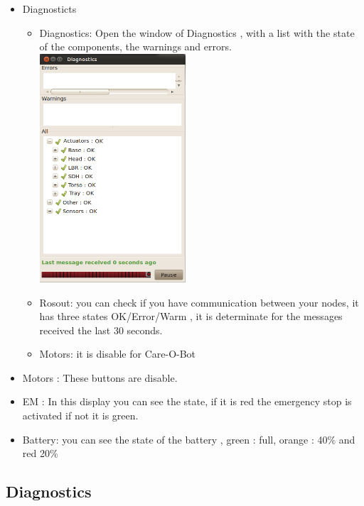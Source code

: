 \begin{itemize}
\item Diagnosticts
\begin{itemize}
\item Diagnostics: Open the window of Diagnostics , with a list with the state of the components, the warnings and errors.
\\
 \includegraphics[width=0.45\textwidth]{images/diagnostics.png}
 \\
\item Rosout: you can check if you have communication between your nodes, it has three states OK/Error/Warm , it is determinate for the messages received the last 30 seconds.
\item Motors: it is disable for Care-O-Bot
\end{itemize}
\item Motors : These buttons are disable.
\item EM : In this display you can see the state, if it is red the emergency stop is activated if not it is green.
\item Battery: you can see the state of the battery , green : full, orange : 40\% and red 20\%
\end{itemize}

\subsection {Diagnostics}

